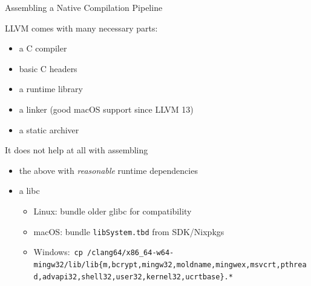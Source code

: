 \documentclass[en,t,navbarkit]{sdqbeamer}
\begin{document}
\begin{frame}[fragile]{Assembling a Native Compilation Pipeline}

  LLVM comes with many necessary parts:
  \begin{itemize}
    \item a C compiler
    \item basic C headers
    \item a runtime library
    \item a linker (good macOS support since LLVM 13)
    \item a static archiver
  \end{itemize}

  \vspace{3mm}
  \pause

  It does not help at all with assembling
  \begin{itemize}
    \item the above with \emph{reasonable} runtime dependencies
          \pause
    \item a libc
          \begin{itemize}
            \item Linux: bundle older glibc for compatibility
            \item macOS: bundle \texttt{libSystem.tbd} from SDK/Nixpkgs
            \item Windows:~\pause\verb!cp /clang64/x86_64-w64-mingw32/lib/lib{m,bcrypt,mingw32,moldname,mingwex,msvcrt,pthread,advapi32,shell32,user32,kernel32,ucrtbase}.*!
          \end{itemize}
  \end{itemize}
\end{frame}

\end{document}
